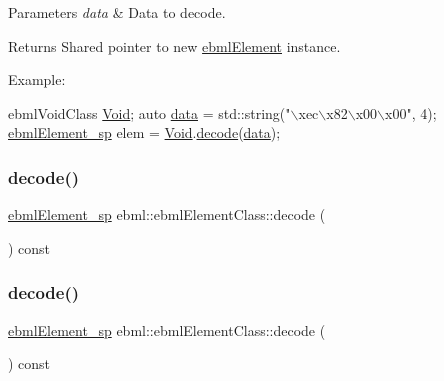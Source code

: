 \begin{DoxyParams}{Parameters}
{\em data} & Data to decode. \\
\hline
\end{DoxyParams}
\begin{DoxyReturn}{Returns}
Shared pointer to new \mbox{\hyperlink{classebml_1_1ebmlElement}{ebml\+Element}} instance.
\end{DoxyReturn}
Example\+: 
\begin{DoxyCode}
ebmlVoidClass \mbox{\hyperlink{namespaceebml_afbfd509d1cb71e416a07253746e886e9}{Void}};
\textcolor{keyword}{auto} \mbox{\hyperlink{namespaceebml_a6365629b3110a3c5d0cde94d08aac26c}{data}} = std::string(\textcolor{stringliteral}{"\(\backslash\)xec\(\backslash\)x82\(\backslash\)x00\(\backslash\)x00"}, 4);
\mbox{\hyperlink{namespaceebml_adad533b7705a16bb360fe56380c5e7be}{ebmlElement\_sp}} elem = \mbox{\hyperlink{namespaceebml_afbfd509d1cb71e416a07253746e886e9}{Void}}.\mbox{\hyperlink{classebml_1_1ebmlElementClass_a9bda26f54e5d5a1e27aaaf0e124ec457}{decode}}(\mbox{\hyperlink{namespaceebml_a6365629b3110a3c5d0cde94d08aac26c}{data}});
\end{DoxyCode}
 \mbox{\label{classebml_1_1ebmlElementClass_ade81fc2a088d16f40474fd9885770f84}} 
\subsubsection{\texorpdfstring{decode()}{decode()}\hspace{0.1cm}{\footnotesize\ttfamily [5/6]}}
{\footnotesize\ttfamily \mbox{\hyperlink{namespaceebml_adad533b7705a16bb360fe56380c5e7be}{ebml\+Element\+\_\+sp}} ebml\+::ebml\+Element\+Class\+::decode (\begin{DoxyParamCaption}\item[{\mbox{\hyperlink{namespaceebml_a7bb59128ac6af27e47367938a846b569}{io\+Base\+\_\+sp}} \&}]{ }\end{DoxyParamCaption}) const}

\mbox{\label{classebml_1_1ebmlElementClass_a313f310d2501859a73ba5d19ebacb550}} 
\subsubsection{\texorpdfstring{decode()}{decode()}\hspace{0.1cm}{\footnotesize\ttfamily [6/6]}}
{\footnotesize\ttfamily \mbox{\hyperlink{namespaceebml_adad533b7705a16bb360fe56380c5e7be}{ebml\+Element\+\_\+sp}} ebml\+::ebml\+Element\+Class\+::decode (\begin{DoxyParamCaption}\item[{\mbox{\hyperlink{classebml_1_1ioBase}{io\+Base}} $\ast$}]{ }\end{DoxyParamCaption}) const}


